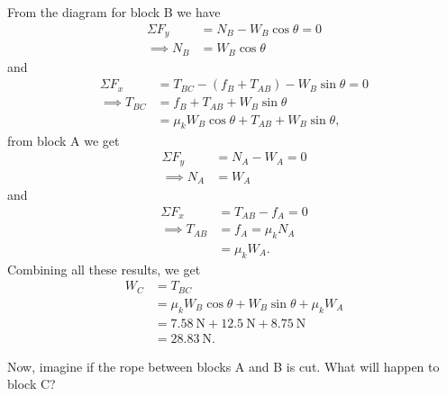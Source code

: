 \documentclass[../classical_mechanics.tex]{subfiles}
\begin{document}
\begin{example}
                From the diagram for block B we have
                \begin{align}
                    \Sigma F_y&=N_B-W_B\cos\theta=0\\
                    \implies N_B&=W_B\cos\theta
                \end{align}
                and
                \begin{align}
                    \Sigma F_x&=T_{BC}-(f_B+T_{AB})-W_B\sin\theta=0\\
                    \implies T_{BC}&=f_B+T_{AB}+W_B\sin\theta\\
                    &=\mu_k W_B\cos\theta+T_{AB}+W_B\sin\theta,
                \end{align}
                from block A we get
                \begin{align}
                    \Sigma F_y&=N_A-W_A=0\\
                    \implies N_A&=W_A
                \end{align}
                and
                \begin{align}
                    \Sigma F_x&=T_{AB}-f_A=0\\
                    \implies T_{AB}&=f_A=\mu_k N_A\\
                    &=\mu_k W_A.
                \end{align}
                Combining all these results, we get
                \begin{align}
                    W_C&=T_{BC}\\
                    &=\mu_k W_B\cos\theta+W_B\sin\theta+\mu_k W_A\\
                    &=\qty{7.58}{\newton}+\qty{12.5}{\newton}+\qty{8.75}{\newton}\\
                    &=\qty{28.83}{\newton}.
                \end{align}

                Now, imagine if the rope between blocks A and B is cut.
                What will happen to block C?


\end{example}
\end{document}
